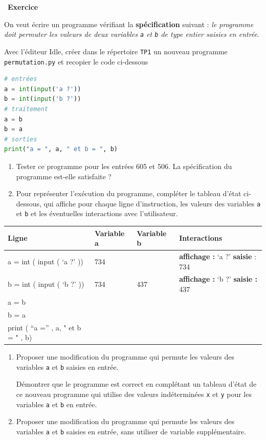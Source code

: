\documentclass[
  11pt,
]{article}
\newcommand{\passthrough}[1]{#1}
\providecommand{\tightlist}{%
  \setlength{\itemsep}{0pt}\setlength{\parskip}{0pt}}
\newcounter{exo}
\newenvironment{exercice}[1]
{\par \medskip   \addtocounter{exo}{1} \noindent  
\begin{bclogo}[arrondi =0.1,   noborder = true, logo=\bccrayon, marge=4]{~\textbf{Exercice} \textbf{\theexo} {\itshape #1} }  \par}
{
\end{bclogo}
 \par \bigskip }
\newcounter{def}
\newcounter{prog}
\begin{document}
\begin{exercice}{}

On veut écrire un programme vérifiant la \textbf{spécification} suivant
: \emph{le programme doit permuter les valeurs de deux variables
\passthrough{\lstinline!a!} et \passthrough{\lstinline!b!} de type
entier saisies en entrée}.

Avec l'éditeur Idle, créer dans le répertoire
\passthrough{\lstinline!TP1!} un nouveau programme
\passthrough{\lstinline!permutation.py!} et recopier le code ci-dessous

\begin{lstlisting}[language=Python]
# entrées
a = int(input('a ?'))
b = int(input('b ?'))
# traitement
a = b
b = a 
# sorties
print("a = ", a, " et b = ", b)
\end{lstlisting}

\begin{enumerate}
\def\labelenumi{\arabic{enumi}.}
\tightlist
\item
  Tester ce programme pour les entrées 605 et 506. La spécification du
  programme est-elle satisfaite ?
\item
  Pour représenter l'exécution du programme, compléter le tableau d'état
  ci-dessous, qui affiche pour chaque ligne d'instruction, les valeurs
  des variables \passthrough{\lstinline!a!} et
  \passthrough{\lstinline!b!} et les éventuelles interactions avec
  l'utilisateur.
\end{enumerate}

\begin{longtable}[]{@{}llll@{}}
\toprule
Ligne & Variable a & Variable b & Interactions \\
\midrule
\endhead
a = int ( input ( `a ?' )) & 734 & & \textbf{affichage :} `a ?'
\textbf{saisie} : 734 \\
b = int ( input ( `b ?' )) & 734 & 437 & \textbf{affichage :} `b ?'
\textbf{saisie :} 437 \\
a = b & & & \\
b = a & & & \\
print ( ``a ='' , a, " et b = " , b) & & & \\
\bottomrule
\end{longtable}

\begin{enumerate}
\def\labelenumi{\arabic{enumi}.}
\item
  Proposer une modification du programme qui permute les valeurs des
  variables \passthrough{\lstinline!a!} et \passthrough{\lstinline!b!}
  saisies en entrée.

  Démontrer que le programme est correct en complétant un tableau d'état
  de ce nouveau programme qui utilise des valeurs indéterminées
  \passthrough{\lstinline!x!} et \passthrough{\lstinline!y!} pour les
  variables \passthrough{\lstinline!a!} et \passthrough{\lstinline!b!}
  en entrée.
\item
  Proposer une modification du programme qui permute les valeurs des
  variables \passthrough{\lstinline!a!} et \passthrough{\lstinline!b!}
  saisies en entrée, sans utiliser de variable supplémentaire.
\end{enumerate}

\end{exercice}
\end{document}
